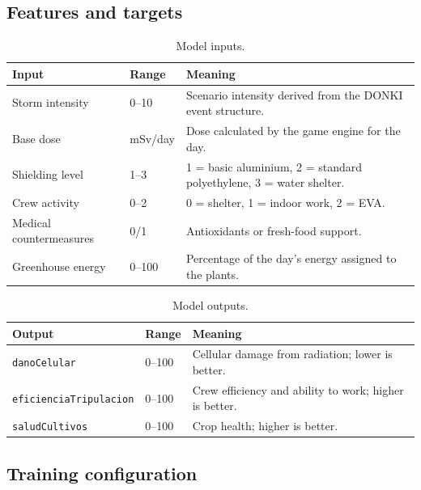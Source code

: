 \documentclass[11pt,a4paper]{article}
\newcommand{\code}[1]{\texttt{#1}}
\begin{document}
\subsection{Features and targets}

\begin{table}[H]
\centering
\small
\begin{tabular}{@{}p{5.2cm}p{2.0cm}p{6.4cm}@{}}
\toprule
\textbf{Input} & \textbf{Range} & \textbf{Meaning}\\
\midrule
Storm intensity & 0--10 & Scenario intensity derived from the DONKI event structure.\\
Base dose & mSv/day & Dose calculated by the game engine for the day.\\
Shielding level & 1--3 & 1 = basic aluminium, 2 = standard polyethylene, 3 = water shelter.\\
Crew activity & 0--2 & 0 = shelter, 1 = indoor work, 2 = EVA.\\
Medical countermeasures & 0/1 & Antioxidants or fresh-food support.\\
Greenhouse energy & 0--100 & Percentage of the day's energy assigned to the plants.\\
\bottomrule
\end{tabular}
\caption{Model inputs.}
\label{tab:model-inputs}
\end{table}

\begin{table}[H]
\centering
\small
\begin{tabular}{@{}p{4.8cm}p{1.6cm}p{7.2cm}@{}}
\toprule
\textbf{Output} & \textbf{Range} & \textbf{Meaning}\\
\midrule
\code{danoCelular} & 0--100 & Cellular damage from radiation; lower is better.\\
\code{eficienciaTripulacion} & 0--100 & Crew efficiency and ability to work; higher is better.\\
\code{saludCultivos} & 0--100 & Crop health; higher is better.\\
\bottomrule
\end{tabular}
\caption{Model outputs.}
\label{tab:model-outputs}
\end{table}

\subsection{Training configuration}
\end{document}
